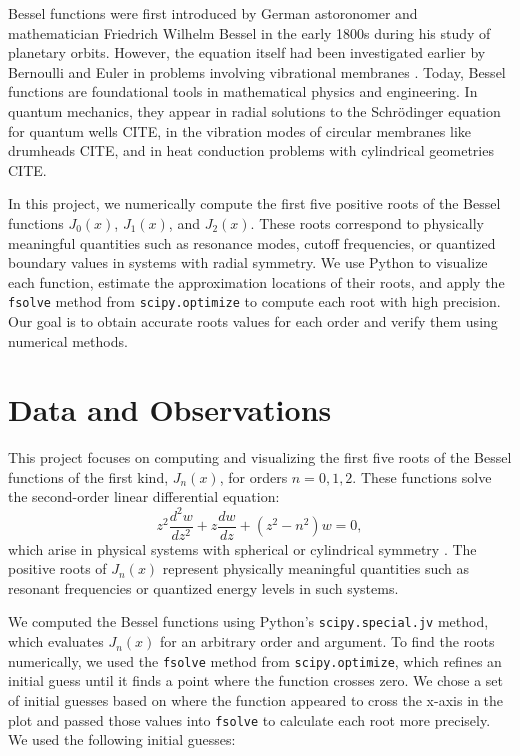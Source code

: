 \documentclass[linenumbers, twocolumn]{aastex631}
\begin{document}
\noindent Bessel functions were first introduced by German astoronomer and
mathematician Friedrich Wilhelm Bessel in the early 1800s during his study of
planetary orbits. However, the equation itself had been investigated earlier
by Bernoulli and Euler in problems involving vibrational membranes
\citet{abramowitz_stegun}. Today, Bessel functions are foundational tools in 
mathematical physics and engineering. In quantum mechanics, they appear in 
radial solutions to the Schrödinger equation for quantum wells CITE, in the 
vibration modes of circular membranes like drumheads CITE, and in heat 
conduction problems with cylindrical geometries CITE.

\noindent In this project, we numerically compute the first five positive roots
of the Bessel functions $J_0(x)$, $J_1(x)$, and $J_2(x)$. These roots correspond
to physically meaningful quantities such as resonance modes, cutoff frequencies, 
or quantized boundary values in systems with radial symmetry. We use Python to visualize each
function, estimate the approximation locations of their roots, and apply the \texttt{fsolve}
method from \texttt{scipy.optimize} to compute each root with high precision. 
Our goal is to obtain accurate roots values for each order and verify them 
using numerical methods.\\


\section{Data and Observations} \label{sec:data}

This project focuses on computing and visualizing the first five roots of the
Bessel functions of the first kind, $J_n(x)$, for orders $n=0,1,2$. These
functions solve the second-order linear differential equation:
\begin{equation}
    z^2\frac{d^2 w}{dz^2}+z\frac{dw}{dz}+(z^2-n^2)w=0,
\end{equation}
\noindent which arise in physical systems with spherical or cylindrical 
symmetry \citet{abramowitz_stegun}. The positive roots of $J_n(x)$ represent physically meaningful
quantities such as resonant frequencies or quantized energy levels in such
systems.

\noindent We computed the Bessel functions using Python's \texttt{scipy.special.jv}
method, which evaluates $J_n(x)$ for an arbitrary order and argument. To
find the roots numerically, we used the \texttt{fsolve} method from \texttt{scipy.optimize},
which refines an initial guess until it finds a point where the function crosses
zero. We chose a set of initial guesses based on where the function appeared to
cross the x-axis in the plot and passed those values into \texttt{fsolve} to
calculate each root more precisely. We used the following initial guesses:
\end{document}
